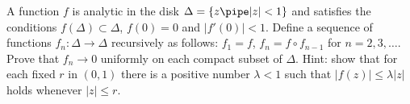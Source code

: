 A function $f$ is analytic in the disk $\Delta=\{z\pipe |z|<1\}$ and
satisfies the conditions $f(\Delta)\subset \Delta$, $f(0)=0$ and
$|f'(0)|<1$. Define a sequence of functions $f_n:\Delta\rightarrow
\Delta$ recursively as follows: $f_1=f$, $f_n=f\circ f_{n-1}$ for
$n=2,3,\ldots $. Prove that $f_n\rightarrow 0$ uniformly on each
compact subset of $\Delta$. Hint: show that for each fixed $r$ in
$(0,1)$ there is a positive number $\lambda<1$ such that $|f(z)|\leq
\lambda|z|$ holds whenever $|z|\leq r$.
